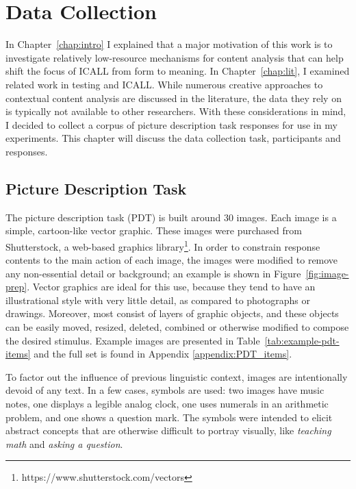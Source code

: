 \chapter{Data Collection}
\label{chap:data}

In Chapter~\ref{chap:intro} I explained that a major motivation of this work is to investigate relatively low-resource mechanisms for content analysis that can help shift the focus of ICALL from form to meaning. In Chapter~\ref{chap:lit}, I examined related work in testing and ICALL. While numerous creative approaches to contextual content analysis are discussed in the literature, the data they rely on is typically not available to other researchers. With these considerations in mind, I decided to collect a corpus of picture description task responses for use in my experiments. This chapter will discuss the data collection task, participants and responses.

\section{Picture Description Task}
\label{sec:pdt}


The picture description task (PDT) is built around 30 images. Each image is a simple, cartoon-like vector graphic. These images were purchased from Shutterstock, a web-based graphics library\footnote{https://www.shutterstock.com/vectors}. In order to constrain response contents to the main action of each image, the images were modified to remove any non-essential detail or background; an example is shown in Figure~\ref{fig:image-prep}. Vector graphics are ideal for this use, because they tend to have an illustrational style with very little detail, as compared to photographs or drawings. Moreover, most consist of layers of graphic objects, and these objects can be easily moved, resized, deleted, combined or otherwise modified to compose the desired stimulus. Example images are presented in Table~\ref{tab:example-pdt-items} and the full set is found in Appendix \ref{appendix:PDT_items}.

To factor out the influence of previous linguistic context, images are intentionally devoid of any text. In a few cases, symbols are used: two images have music notes, one displays a legible analog clock, one uses numerals in an arithmetic problem, and one shows a question mark. The symbols were intended to elicit abstract concepts that are otherwise difficult to portray visually, like \textit{teaching math} and \textit{asking a question}. 

